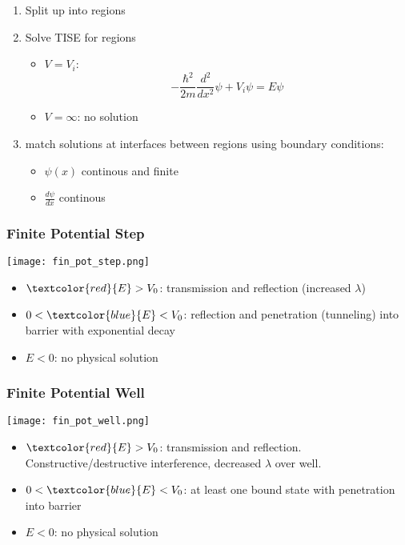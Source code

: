 \begin{enumerate}
    \item Split up into regions
    \item Solve TISE for regions
          \begin{itemize}
              \item $V=V_i$:
                    \noindent\begin{equation*}
                        -\frac{\hbar^2}{2m}\frac{d^2}{dx^2} \psi + V_i\psi=E\psi
                    \end{equation*}
              \item $V=\infty$: no solution
          \end{itemize}
    \item match solutions at interfaces between regions using boundary conditions:
          \begin{itemize}
              \item $\psi(x)$ continous and finite
              \item $\frac{d\psi}{dx}$ continous
          \end{itemize}
\end{enumerate}

\subsubsection{Finite Potential Step}
\begin{center}
    \texttt{[image: fin\_pot\_step.png]}
\end{center}
\begin{itemize}
    \item $\textcolor{red}{E}>V_0$: transmission and reflection (increased $\lambda$)
    \item $0<\textcolor{blue}{E}<V_0$: reflection and penetration (tunneling) into barrier with exponential decay
    \item $E<0$: no physical solution
\end{itemize}

\subsubsection{Finite Potential Well}
\begin{center}
    \texttt{[image: fin\_pot\_well.png]}
\end{center}
\begin{itemize}
    \item $\textcolor{red}{E}>V_0$: transmission and reflection. Constructive/destructive interference, decreased $\lambda$ over well.
    \item $0<\textcolor{blue}{E}<V_0$: at least one bound state with penetration into barrier
    \item $E<0$: no physical solution
\end{itemize}

